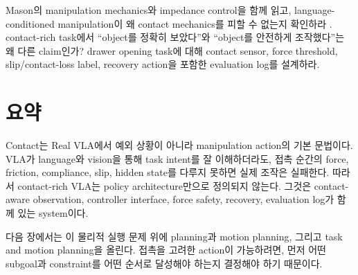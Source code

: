 \chapterwork
{Mason의 manipulation mechanics와 impedance control을 함께 읽고, language-conditioned manipulation이 왜 contact mechanics를 피할 수 없는지 확인하라 \cite{mason2001,hogan1985}.}
{contact-rich task에서 ``object를 정확히 보았다''와 ``object를 안전하게 조작했다''는 왜 다른 claim인가?}
{drawer opening task에 대해 contact sensor, force threshold, slip/contact-loss label, recovery action을 포함한 evaluation log를 설계하라.}

\section{요약}

Contact는 Real VLA에서 예외 상황이 아니라 manipulation action의 기본 문법이다. VLA가 language와 vision을 통해 task intent를 잘 이해하더라도, 접촉 순간의 force, friction, compliance, slip, hidden state를 다루지 못하면 실제 조작은 실패한다. 따라서 contact-rich VLA는 policy architecture만으로 정의되지 않는다. 그것은 contact-aware observation, controller interface, force safety, recovery, evaluation log가 함께 있는 system이다.

다음 장에서는 이 물리적 실행 문제 위에 planning과 motion planning, 그리고 task and motion planning을 올린다. 접촉을 고려한 action이 가능하려면, 먼저 어떤 subgoal과 constraint를 어떤 순서로 달성해야 하는지 결정해야 하기 때문이다.

